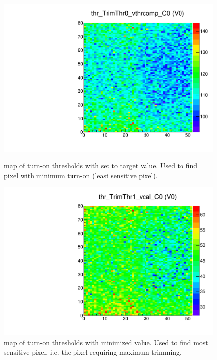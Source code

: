 \begin{figure}[!htp]
\centering
\begin{minipage}{0.45\textwidth}

  \includegraphics[width=1.0\textwidth]{figures/trim_thr_TrimThr0_vthrcomp.pdf}
  \caption{\roc map of \vthrcomp turn-on thresholds with \vcal set to target value.
           Used to find pixel with minimum turn-on (least sensitive pixel).}
  \label{fig:trim_thr_TrimThr0_vthrcomp}
\end{minipage}
\hspace{0.3cm}
\begin{minipage}{0.45\textwidth}

  \includegraphics[width=1.0\textwidth]{figures/trim_thr_TrimThr1_vcal.pdf}
  \caption{\roc map of \vcal turn-on thresholds with minimized \vthrcomp value.  
           Used to find most sensitive pixel, i.e. the pixel requiring maximum trimming.}
  \label{fig:trim_thr_TrimThr1_vcal}
\end{minipage}
\end{figure}

